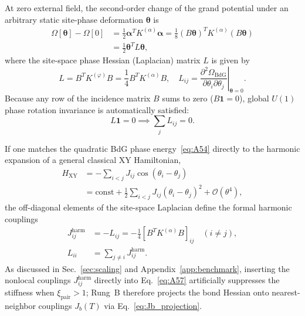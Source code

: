\documentclass[aps,prb,twocolumn,superscriptaddress,floatfix]{revtex4-2}
\begin{document}
At zero external field, the second-order change of the grand potential under an arbitrary static site-phase deformation $\bm{\theta}$ is
\begin{equation}
\begin{aligned}
\Omega[\bm{\theta}] - \Omega[0] &= \frac{1}{2}\bm{\alpha}^T K^{(\alpha)} \bm{\alpha} = \frac{1}{8}(B\bm{\theta})^T K^{(\alpha)} (B\bm{\theta}) \\
&= \frac{1}{2}\bm{\theta}^T L \bm{\theta},
\end{aligned}
\label{eq:A54}
\end{equation}
where the site-space phase Hessian (Laplacian) matrix $L$ is given by
\begin{equation}
L = B^T K^{(\varphi)} B = \frac{1}{4} B^T K^{(\alpha)} B, \quad L_{ij} = \left.\frac{\partial^2 \Omega_{\mathrm{BdG}}}{\partial \theta_i \partial \theta_j}\right|_{\bm{\theta}=0}.
\label{eq:A55}
\end{equation}
Because any row of the incidence matrix $B$ sums to zero ($B\bm{1} = 0$), global $U(1)$ phase rotation invariance is automatically satisfied:
\begin{equation}
L\bm{1} = 0 \implies \sum_j L_{ij} = 0.
\label{eq:A56}
\end{equation}

If one matches the quadratic BdG phase energy~\eqref{eq:A54} directly to the harmonic expansion of a general classical XY Hamiltonian,
\begin{equation}
\begin{aligned}
H_{\mathrm{XY}} &= -\sum_{i<j} J_{ij}\cos(\theta_i - \theta_j) \\
&= \mathrm{const} + \frac{1}{2}\sum_{i<j} J_{ij}(\theta_i - \theta_j)^2 + \mathcal{O}(\theta^4),
\end{aligned}
\label{eq:A57}
\end{equation}
the off-diagonal elements of the site-space Laplacian define the formal harmonic couplings
\begin{equation}
\begin{aligned}
J_{ij}^{\mathrm{harm}} &= -L_{ij} = -\frac{1}{4}\left[ B^T K^{(\alpha)} B \right]_{ij} \quad (i \neq j), \\
L_{ii} &= \sum_{j \neq i} J_{ij}^{\mathrm{harm}}.
\end{aligned}
\label{eq:A58}
\end{equation}
As discussed in Sec.~\ref{sec:scaling} and Appendix~\ref{app:benchmark}, inserting the nonlocal couplings $J_{ij}^{\mathrm{harm}}$ directly into Eq.~\eqref{eq:A57} artificially suppresses the stiffness when $\xi_{\mathrm{pair}} > 1$; Rung~B therefore projects the bond Hessian onto nearest-neighbor couplings $J_b(T)$ via Eq.~\eqref{eq:Jb_projection}.
\end{document}

